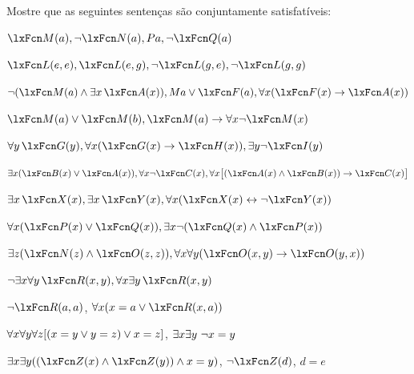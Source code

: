 \problempart
Mostre que as seguintes sentenças são conjuntamente satisfatíveis:
\begin{compactlist}
\item $\atom{M}{a}, \enot \atom{N}{a}, Pa, \enot \atom{Q}{a}$
\item $\atom{L}{e,e}, \atom{L}{e,g}, \enot \atom{L}{g,e}, \enot \atom{L}{g,g}$
\item $\enot (\atom{M}{a} \eand \exists x\,\atom{A}{x}), Ma \eor \atom{F}{a}, \forall x(\atom{F}{x} \eif \atom{A}{x})$
\item $\atom{M}{a} \eor \atom{M}{b}, \atom{M}{a} \eif \forall x \enot \atom{M}{x}$
\item $\forall y\,\atom{G}{y}, \forall x (\atom{G}{x} \eif \atom{H}{x}), \exists y \enot \atom{I}{y}$
\item $\exists x(\atom{B}{x} \eor \atom{A}{x}), \forall x \enot \atom{C}{x}, \forall x\bigl[(\atom{A}{x} \eand \atom{B}{x}) \eif \atom{C}{x}\bigr]$
\item $\exists x\,\atom{X}{x}, \exists x\,\atom{Y}{x}, \forall x(\atom{X}{x} \eiff \enot \atom{Y}{x})$
\item $\forall x(\atom{P}{x} \eor \atom{Q}{x}), \exists x\enot(\atom{Q}{x} \eand \atom{P}{x})$
\item $\exists z(\atom{N}{z} \eand \atom{O}{z,z}), \forall x\forall y(\atom{O}{x,y} \eif \atom{O}{y,x})$
\item $\enot \exists x \forall y\,\atom{R}{x,y}, \forall x \exists y\,\atom{R}{x,y}$
\item $\enot \atom{R}{a,a}$, $\forall x (x=a \eor \atom{R}{x,a})$

\item $\forall x\forall y\forall z[(x=y \vee y=z )\vee x=z]$, $\exists x\exists y\ \neg x= y$


\item $\exists x\exists y((\atom{Z}{x} \eand \atom{Z}{y} )\eand x=y)$, $\enot \atom{Z}{d}$, $d=e$
\end{compactlist}


